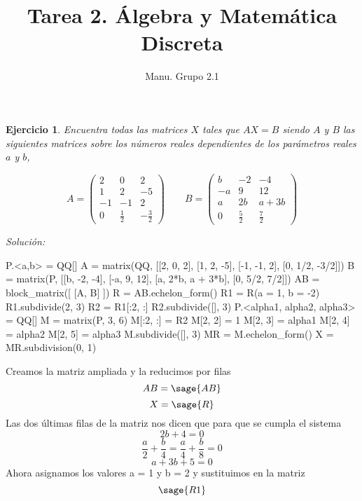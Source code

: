 \documentclass{amsart}
\title{Tarea 2. Álgebra y Matemática Discreta}
\author{Manu. Grupo 2.1}
\newtheorem{ejer}{Ejercicio}
\begin{document}
\maketitle

\begin{ejer}
Encuentra todas las matrices $X$ tales que $AX = B$ siendo $A$ y $B$ las
siguientes matrices sobre los números reales dependientes de los parámetros
reales $a$ y $b$, 

\[
A = \left(\begin{array}{rrr}
2 & 0 & 2 \\
1 & 2 & -5 \\
-1 & -1 & 2 \\
0 & \frac{1}{2} & -\frac{3}{2}
\end{array}\right) \qquad
B = \left(\begin{array}{rrr}
b  & -2 & -4 \\
-a & 9 & 12 \\
a  & 2b & a+3b \\
0 & \frac{5}{2} & \frac{7}{2}
\end{array}\right)
\]
\end{ejer}
{\it Solución: }

\begin{sageblock}
P.<a,b> = QQ[]
A = matrix(QQ, [[2, 0, 2], [1, 2, -5], [-1, -1, 2], [0, 1/2, -3/2]])
B = matrix(P, [[b, -2, -4], [-a, 9, 12], [a, 2*b, a + 3*b], [0, 5/2, 7/2]])
AB = block_matrix([ [A, B] ])
R = AB.echelon_form()
R1 = R(a = 1, b = -2)
R1.subdivide(2, 3)
R2 = R1[:2, :]
R2.subdivide([], 3)
P.<alpha1, alpha2, alpha3> = QQ[]
M = matrix(P, 3, 6)
M[:2, :] = R2
M[2, 2] = 1
M[2, 3] = alpha1
M[2, 4] = alpha2
M[2, 5] = alpha3
M.subdivide([], 3)
MR = M.echelon_form()
X = MR.subdivision(0, 1)
\end{sageblock}

Creamos la matriz ampliada y la reducimos por filas
$$ AB = \sage{AB} $$
$$ X = \sage{R} $$
Las dos últimas filas de la matriz nos dicen que para que se cumpla el sistema
$$ 2b + 4 = 0 $$
$$ \frac{a}{2} + \frac{b}{4} = \frac{a}{4} + \frac{b}{8} = 0 $$
$$ a + 3b + 5 = 0 $$
Ahora asignamos los valores a = 1 y b = 2 y sustituimos en la matriz
$$ \sage{R1} $$
\end{document}
